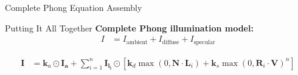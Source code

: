 \begin{frame}{Complete Phong Equation Assembly}
  \begin{mathbox}{Putting It All Together}
    \textbf{Complete Phong illumination model:}
    \begin{align*}
      I &= I_{\text{ambient}} + I_{\text{diffuse}} + I_{\text{specular}}
    \end{align*}

    \pause
    \begin{align*}
      \mathbf{I} &= \mathbf{k}_a \odot \mathbf{I_a} + \sum_{i=1}^{n} \mathbf{I_{l_i}} \odot \left[ \mathbf{k}_d \max(0, \mathbf{N} \cdot \mathbf{L}_i) + \mathbf{k}_s \max(0, \mathbf{R}_i \cdot \mathbf{V})^n \right]
    \end{align*}
  \end{mathbox}
\end{frame}
